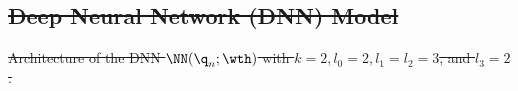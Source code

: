 \documentclass[letterpaper, journal]{IEEEtran}
\newcommand{\src}{./src} %
\providecommand{\DIFdel}[1]{{\protect\color{red}\sout{#1}}} %
\providecommand{\DIFdelFL}[1]{\DIFdel{#1}} %
\begin{document}
\subsection{\DIFdel{Deep Neural Network (DNN) Model}}%
\addtocounter{subsection}{-1}%

{%
\DIFdelFL{Architecture of the DNN $\NN({\q}_n;\wth)$ with $k=2,l_0=2,l_1=l_2=3$, and $l_3=2$.
    }}
\end{document}
